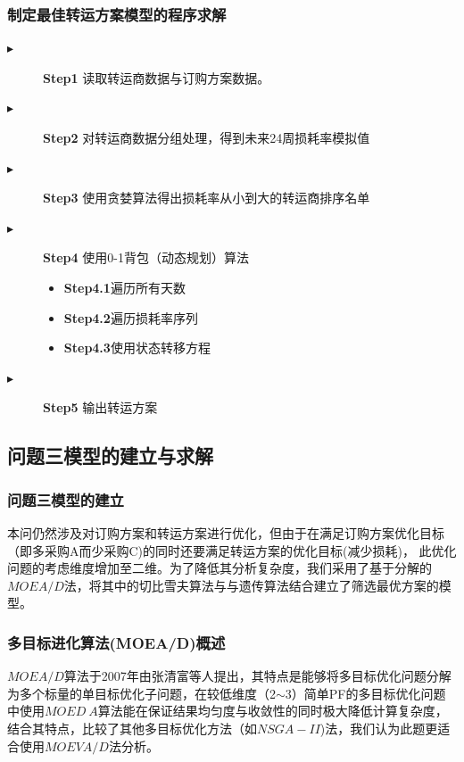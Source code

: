 \documentclass[withoutpreface,bwprint]{cumcmthesis}
\begin{document}
\subsubsection*{制定最佳转运方案模型的程序求解}
\begin{description}
    \item[$\blacktriangleright$] \textbf{Step1} 读取转运商数据与订购方案数据。
    \item[$\blacktriangleright$] \textbf{Step2} 对转运商数据分组处理，得到未来24周损耗率模拟值
    \item[$\blacktriangleright$] \textbf{Step3} 使用贪婪算法得出损耗率从小到大的转运商排序名单
    \item[$\blacktriangleright$] \textbf{Step4} 使用0-1背包（动态规划）算法
        \begin{itemize}
            \item \textbf{Step4.1}遍历所有天数
            \item \textbf{Step4.2}遍历损耗率序列
            \item \textbf{Step4.3}使用状态转移方程
        \end{itemize}
    \item[$\blacktriangleright$] \textbf{Step5} 输出转运方案
\end{description}



\subsection{问题三模型的建立与求解}
\subsubsection{问题三模型的建立}
本问仍然涉及对订购方案和转运方案进行优化，但由于在满足订购方案优化目标（即多采购A而少采购C)的同时还要满足转运方案的优化目标(减少损耗)，
此优化问题的考虑维度增加至二维。为了降低其分析复杂度，我们采用了基于分解的$MOEA/D$法，将其中的切比雪夫算法与与遗传算法结合建立了筛选最优方案的模型。

\subsubsection*{多目标进化算法(MOEA/D)概述}
$MOEA/D$算法于2007年由张清富等人提出，其特点是能够将多目标优化问题分解为多个标量的单目标优化子问题，在较低维度（2$\sim$3）简单PF的多目标优化问题中使用$MOED \ A$算法能在保证结果均匀度与收敛性的同时极大降低计算复杂度，
结合其特点，比较了其他多目标优化方法（如$NSGA-II$)法，我们认为此题更适合使用$MOEVA/D$法分析。
\end{document}

